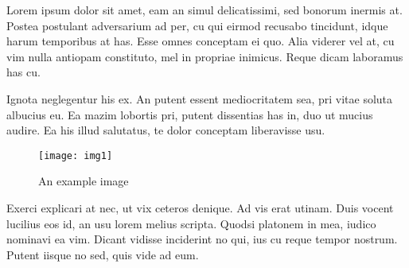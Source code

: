 Lorem ipsum dolor sit amet, eam an simul delicatissimi, sed bonorum inermis at. Postea postulant adversarium ad per, cu qui eirmod recusabo tincidunt, idque harum temporibus at has. Esse omnes conceptam ei quo. Alia viderer vel at, cu vim nulla antiopam constituto, mel in propriae inimicus. Reque dicam laboramus has cu.\parencite{r1}

Ignota neglegentur his ex. An putent essent mediocritatem sea, pri vitae soluta albucius eu. Ea mazim lobortis pri, putent dissentias has in, duo ut mucius audire. Ea his illud salutatus, te dolor conceptam liberavisse usu.
\begin{figure}[ht]
\centering
\texttt{[image: img1]}
\caption{An example image}
\label{fig: test_img}
\end{figure}

Exerci explicari at nec, ut vix ceteros denique. Ad vis erat utinam. Duis vocent lucilius eos id, an usu lorem melius scripta. Quodsi platonem in mea, iudico nominavi ea vim. Dicant vidisse inciderint no qui, ius cu reque tempor nostrum. Putent iisque no sed, quis vide ad eum.